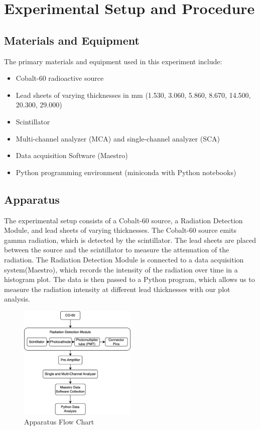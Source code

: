 \documentclass[12pt]{article}
\begin{document}
    \section{Experimental Setup and Procedure}
        \subsection{Materials and Equipment}
            The primary materials and equipment used in this experiment include:
            \begin{itemize}
                \item Cobalt-60 radioactive source
                \item Lead sheets of varying thicknesses in mm (1.530, 3.060, 5.860, 8.670, 14.500, 20.300, 29.000) 
                \item Scintillator
                \item Multi-channel analyzer (MCA) and single-channel analyzer (SCA)
                \item Data acquisition Software (Maestro)
                \item Python programming environment (miniconda with Python notebooks)
            \end{itemize}
            
        \subsection{Apparatus}
            The experimental setup consists of a Cobalt-60 source, a Radiation Detection Module, and lead sheets of varying thicknesses. 
            The Cobalt-60 source emits gamma radiation, which is detected by the scintillator. 
            The lead sheets are placed between the source and the scintillator to measure the attenuation of the radiation. 
            The Radiation Detection Module is connected to a data acquisition system(Maestro), which records the intensity of the radiation over time in a histogram plot. 
            The data is then passed to a Python program, which allows us to measure the radiation intensity at different lead thicknesses with our plot analysis.
            
            \begin{figure}[!htb]
                \centering
                \includegraphics[width=0.5\textwidth]{./img/other/Lab1 Apparatus.png}
                \caption{Apparatus Flow Chart}
                \label{fig:graph1}
            \end{figure}
\end{document}
